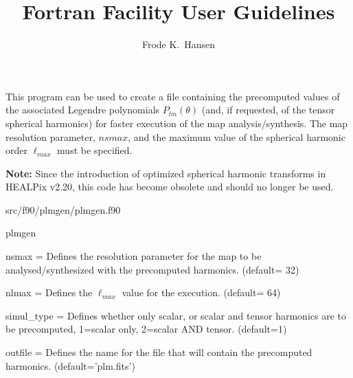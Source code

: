 
\sloppy


\title{\healpix Fortran Facility User Guidelines}
 \section[plmgen]{\nosectionname}
\label{fac:plmgen}
\author{Frode K.~Hansen}

\begin{facility}
{This program can be used to create a file containing 
the precomputed values of the associated Legendre polynomials
$P_{lm}(\theta)$ (and, if requested, of the tensor spherical harmonics) 
for faster execution of the \healpix map analysis/synthesis. 
The  map resolution parameter, $nsmax$,
and the maximum value of the spherical harmonic order $\ell_{max}$
must be specified.

{\bf Note:} Since the introduction of optimized spherical harmonic transforms
in HEALPix v2.20, this code has become obsolete and should no longer be
used.}
{src/f90/plmgen/plmgen.f90}
\end{facility}

\begin{f90facility}
{plmgen}
\end{f90facility}

\begin{qualifiers}
  \begin{qulist}{} %
    \item[{nsmax = }] Defines the resolution parameter for the map to 
be analysed/synthesized with the precomputed harmonics. 
	(default= 32)
    \item[{nlmax = }] Defines the $\ell_{max}$ value for the execution.
(default= 64)
     \item[{simul\_type = }] Defines whether only scalar, or scalar and 
tensor harmonics are to be precomputed, 1=scalar only, 2=scalar AND tensor.
(default=1)
\item[{outfile = }] Defines the name for the file that will 
contain the precomputed harmonics.
(default='plm.fits')
  \end{qulist}
\end{qualifiers}

